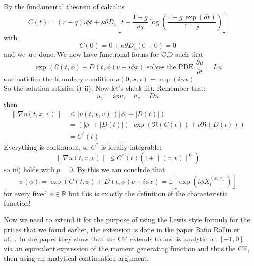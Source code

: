 By the fundamental theorem of calculus
\begin{equation}C(t)=(r-q) i \phi t +\kappa \theta D_1\left[ t+\frac{1-g}{dg}\log\left(\frac{1-g\,\exp(dt)}{1-g}\right)\right]\end{equation}
with
\begin{equation}C(0)=0+\kappa \theta D_1 (0+0)=0\end{equation}
and we are done. We now have functional forms for C,D such that
\begin{equation}\exp(C(t,\phi)+D(t,\phi)v+i\phi x) \text{ solves the PDE } \frac{\partial u }{\partial t}=Lu\end{equation}
and satisfies the boundary condition $u(0,x,v)=\exp(i\phi x)$\\

So the solution satisfies i)--ii). Now let's check iii). Remember that:
\begin{equation}u_x=i\phi u,\quad u_v=Du\end{equation}
then
\begin{align}
\|\nabla u(t,x,v)\|&\leq|u(t,x,v)|(|\phi|+|D(t)|)\\
&=(|\phi|+|D(t)|)\,\,\exp(\Re (C(t))+v\Re (D(t)))\\
&=C^*(t)
\end{align}
Everything is continuous, so $C^*$ is locally integrable:
\begin{equation}\|\nabla u(t,x,v)\| \leq C^*(t)(1+\|(x,v)\|^0)\end{equation}
so iii) holds with $p=0$. By this we can conclude that
\begin{equation}\psi(\phi)=\exp(C(t,\phi)+D(t,\phi)v+i\phi x)=\mathbb{E}[\exp(i\phi X_t^{(x,v)})]\end{equation}
for every fixed $\phi\in \mathbb{R}$
but this is exactly the definition of the characteristic function!

Now we need to extend it for the purpose of using the Lewis style formula for the prices that we found earlier, the extension is done in the paper Ba\~{n}o Rollin et al.~\cite{delBanoRollin2010}.
In the paper they show that the CF extends to and is analytic on $[-1,0]$ via an equivalent expression of the moment generating function and thus the CF, then using an analytical continuation argument.





